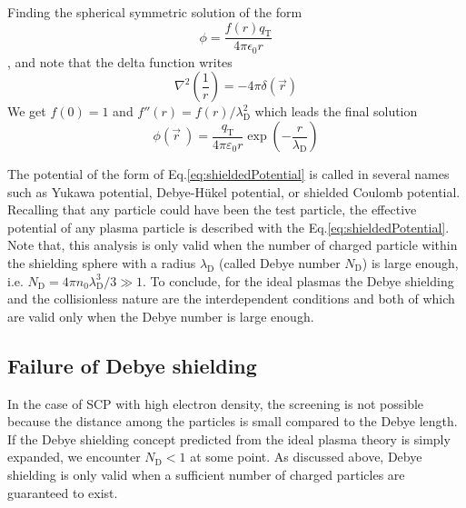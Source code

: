 Finding the spherical symmetric solution of the form
\begin{equation}
\phi=\frac{f(r) q_\text{T}}{4 \pi \epsilon_{0} r}
\end{equation}
, and note that the delta function writes 
\begin{equation}
\nabla^{2}\left(\frac{1}{r}\right)=-4 \pi \delta \left( \vec{r} \right)
\end{equation}
We get $f(0)=1$ and $f''(r)=f(r)/\lambda_\text{D}^2$ which leads the final solution 
\begin{equation}
\phi \left( \vec{r} ~\right) = \frac{q_\text{T}}{4 \pi \varepsilon_0 r} \exp \left( -\frac{r}{\lambda_\text{D}} \right)
\label{eq:shieldedPotential}
\end{equation}

The potential of the form of Eq.\ref{eq:shieldedPotential} is called in several names such as Yukawa potential, Debye-H\"{u}kel potential, or shielded Coulomb potential. Recalling that any particle could have been the test particle, the effective potential of any plasma particle is described with the Eq.\ref{eq:shieldedPotential}. Note that, this analysis is only valid when the number of charged particle within the shielding sphere with a radius $\lambda_\text{D}$ (called Debye number $N_\text{D}$) is large enough, i.e. $N_\text{D} = 4 \pi n_0 \lambda_\text{D}^3/3 \gg 1$. To conclude, for the ideal plasmas the Debye shielding and the collisionless nature are the interdependent conditions and both of which are valid only when the Debye number is large enough.

\subsection{Failure of Debye shielding}
\label{sec:ch3-1-2}

In the case of SCP with high electron density, the screening is not possible because the distance among the particles is small compared to the Debye length. If the Debye shielding concept predicted from the ideal plasma theory is simply expanded, we encounter $N_\text{D} < 1$ at some point. As discussed above, Debye shielding is only valid when a sufficient number of charged particles are guaranteed to exist.

